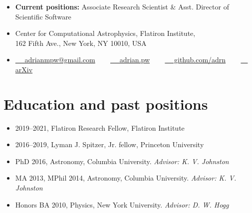 \documentclass[12pt, letterpaper]{apw-cv}
\begin{document}
\thispagestyle{empty}\sloppy\sloppypar




\begin{itemize}
  \item \textbf{Current positions:} Associate Research Scientist \& Asst. Director of Scientific Software
  \item Center for Computational Astrophysics, Flatiron Institute, \\ 162 Fifth Ave., New York, NY 10010, USA
  \item
    \href{mailto:adrianmpw@gmail.com}{\faEnvelope ~~ adrianmpw@gmail.com}
    ~~~
	\href{http://adrian.pw}{\faExternalLink* ~~ adrian.pw}
    ~~~
	\href{https://github.com/adrn}{\faGithub ~~ github.com/adrn}
    ~~~
    \href{\arxivurl}{\faFile ~~ arXiv}
\end{itemize}




\section*{Education and past positions}
	\begin{itemize}
        \item 2019--2021, Flatiron Research Fellow, Flatiron Institute
        \item 2016--2019, Lyman J. Spitzer, Jr. fellow, Princeton University
	\item PhD 2016, Astronomy, Columbia University.
		{\it Advisor: K. V. Johnston}
	\item MA 2013, MPhil 2014, Astronomy, Columbia University.
		{\it Advisor: K. V. Johnston}
	\item Honors BA 2010, Physics, New York University.
		{\it Advisor: D. W. Hogg}
	\end{itemize}
\end{document}
